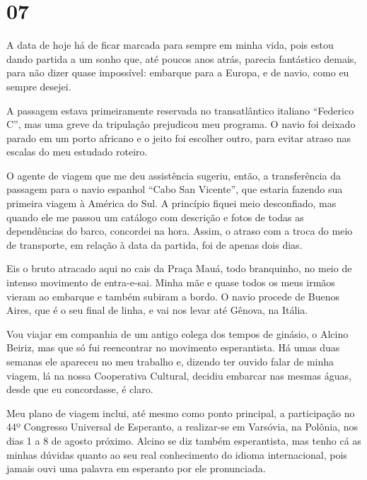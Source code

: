 \section*{07 \adfflatleafright {}}

A data de hoje há de ficar marcada para sempre em minha vida,  pois estou dando partida a um sonho que, até poucos anos atrás, parecia fantástico demais, para não dizer quase impossível: embarque para a Europa, e de navio, como eu sempre desejei.

A passagem estava primeiramente reservada no transatlântico italiano ``Federico C'', mas uma greve da tripulação prejudicou meu programa. O navio foi deixado parado em um porto africano e o jeito foi escolher outro, para evitar atraso nas escalas do meu estudado roteiro.

O agente de viagem que me deu assistência sugeriu, então, a transferência da passagem para o navio espanhol ``Cabo San Vicente'', que estaria fazendo sua primeira viagem à América do Sul. A princípio fiquei meio desconfiado, mas quando ele me passou um catálogo com descrição e fotos de todas as dependências do barco, concordei na hora. Assim, o atraso com a troca do meio de transporte, em relação à data da partida, foi de apenas dois dias.

Eis o bruto atracado aqui no cais da Praça Mauá, todo branquinho, no meio de intenso movimento de entra-e-sai. Minha mãe e quase todos os meus irmãos vieram ao embarque e também subiram a bordo. O navio procede de Buenos Aires, que é o seu final de linha, e vai nos levar até Gênova, na Itália.

Vou viajar em companhia de um antigo colega dos tempos de ginásio, o Alcino Beiriz, mas que só fui reencontrar no movimento esperantista. Há umas duas semanas ele apareceu no meu trabalho e, dizendo ter ouvido falar de minha viagem, lá na nossa Cooperativa Cultural, decidiu embarcar nas mesmas águas, desde que eu concordasse, é claro.

Meu plano de viagem inclui, até mesmo como ponto principal, a participação no 44º Congresso Universal de Esperanto, a realizar-se em Varsóvia, na Polônia, nos dias 1 a 8 de agosto próximo. Alcino se diz também esperantista, mas tenho cá as minhas dúvidas quanto ao seu real conhecimento do idioma internacional, pois jamais ouvi uma palavra em esperanto por ele pronunciada.


